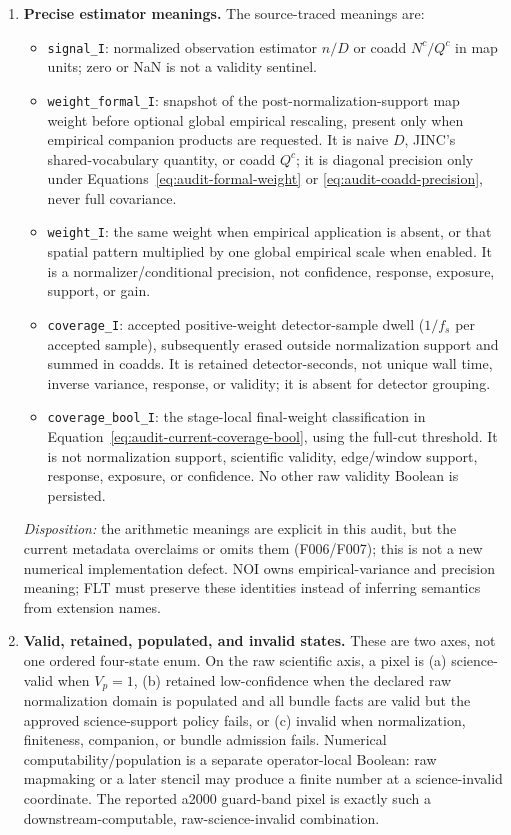 \documentclass[11pt]{article}
\newcommand{\code}[1]{\nolinkurl{#1}}
\begin{document}
\begin{enumerate}[leftmargin=*,label=\arabic*.]
\item \textbf{Precise estimator meanings.}
The source-traced meanings are:
\begin{itemize}[leftmargin=1.4em]
\item \code{signal_I}: normalized observation estimator \(n/D\) or coadd
\(N^c/Q^c\) in map units; zero or NaN is not a validity sentinel.
\item \code{weight_formal_I}: snapshot of the post-normalization-support map
weight before optional global empirical rescaling, present only when empirical
companion products are requested.  It is naive \(D\), JINC's shared-vocabulary
quantity, or coadd \(Q^c\); it is diagonal precision only under
Equations~\eqref{eq:audit-formal-weight} or
\eqref{eq:audit-coadd-precision}, never full covariance.
\item \code{weight_I}: the same weight when empirical application is absent,
or that spatial pattern multiplied by one global empirical scale when enabled.
It is a normalizer/conditional precision, not confidence, response, exposure,
support, or gain.
\item \code{coverage_I}: accepted positive-weight detector-sample dwell
(\(1/f_s\) per accepted sample), subsequently erased outside normalization
support and summed in coadds.  It is retained detector-seconds, not unique wall
time, inverse variance, response, or validity; it is absent for detector
grouping.
\item \code{coverage_bool_I}: the stage-local final-weight classification in
Equation~\eqref{eq:audit-current-coverage-bool}, using the full-cut threshold.
It is not normalization support, scientific validity, edge/window support,
response, exposure, or confidence.  No other raw validity Boolean is
persisted.
\end{itemize}

\emph{Disposition:} the arithmetic meanings are explicit in this audit, but
the current metadata overclaims or omits them (F006/F007); this is not a new
numerical implementation defect.  NOI owns empirical-variance and precision
meaning; FLT must preserve these identities instead of inferring semantics from
extension names.

\item \textbf{Valid, retained, populated, and invalid states.}
These are two axes, not one ordered four-state enum.  On the raw scientific
axis, a pixel is (a) science-valid when \(V_p=1\), (b) retained low-confidence
when the declared raw normalization domain is populated and all bundle facts
are valid but the approved science-support policy fails, or (c) invalid when
normalization, finiteness, companion, or bundle admission fails.  Numerical
computability/population is a separate operator-local Boolean: raw mapmaking or
a later stencil may produce a finite number at a science-invalid coordinate.
The reported a2000 guard-band pixel is exactly such a downstream-computable,
raw-science-invalid combination.


\end{enumerate}
\end{document}
